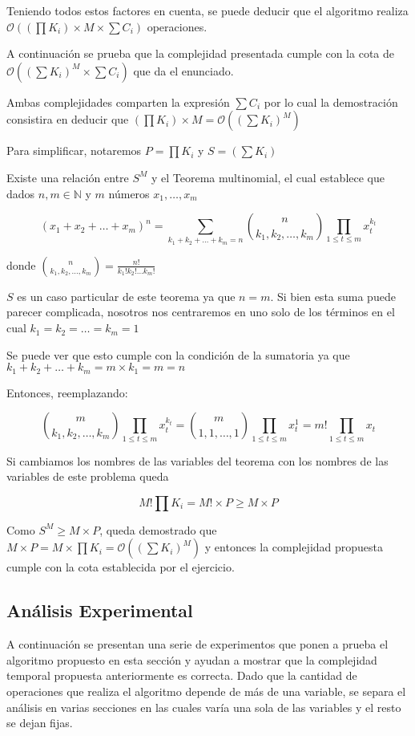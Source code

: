 Teniendo todos estos factores en cuenta, se puede deducir que el algoritmo realiza $\mathcal{O}((\prod K_i) \times M \times \sum C_i)$ operaciones.

A continuación se prueba que la complejidad presentada cumple con la cota de $\mathcal{O}((\sum K_i)^M \times \sum C_i)$ que da el enunciado.

Ambas complejidades comparten la expresión $\sum C_i$ por lo cual la demostración consistira en deducir que $(\prod K_i) \times M = \mathcal{O}((\sum K_i)^M)$

Para simplificar, notaremos $P = \prod K_i$ y $S = (\sum K_i)$

Existe una relación entre $S^M$ y el Teorema multinomial, el cual establece que dados $n, m \in \mathbb{N}$ y $m$ números $x_1, \ldots , x_m$

$$(x_1 + x_2 + \ldots + x_m)^n = \sum_{k_1 + k_2 + \ldots + k_m = n} \binom{n}{k_1, k_2, \ldots , k_m} \prod_{1 \leq t \leq m} x_t^{k_t}$$

donde $\binom{n}{k_1, k_2, \ldots , k_m} = \frac{n!}{k_1! k_2! \ldots k_m!}$

$S$ es un caso particular de este teorema ya que $n = m$. Si bien esta suma puede parecer complicada, nosotros nos centraremos en uno solo de los términos en el cual $k_1 = k_2 = \ldots = k_m = 1$

Se puede ver que esto cumple con la condición de la sumatoria ya que $k_1 + k_2 + \ldots + k_m = m \times k_1 = m = n$

Entonces, reemplazando:

$$ \binom{m}{k_1, k_2, \ldots , k_m} \prod_{1 \leq t \leq m} x_t^{k_t} = \binom{m}{1, 1, \ldots , 1} \prod_{1 \leq t \leq m} x_t^{1} = m! \prod_{1 \leq t \leq m} x_t $$

Si cambiamos los nombres de las variables del teorema con los nombres de las variables de este problema queda

$$M! \prod K_i = M! \times P \geq M \times P$$

Como $S^M \geq M \times P$, queda demostrado que $M \times P = M \times \prod K_i = \mathcal{O}((\sum K_i)^M)$ y entonces la complejidad propuesta cumple con la cota establecida por el ejercicio.\QEDB

\subsection{Análisis Experimental}

A continuación se presentan una serie de experimentos que ponen a prueba el algoritmo propuesto en esta sección y ayudan a mostrar que la complejidad temporal propuesta anteriormente es correcta.
Dado que la cantidad de operaciones que realiza el algoritmo depende de más de una variable, se separa el análisis en varias secciones en las cuales varía una sola de las variables y el resto se dejan fijas.

